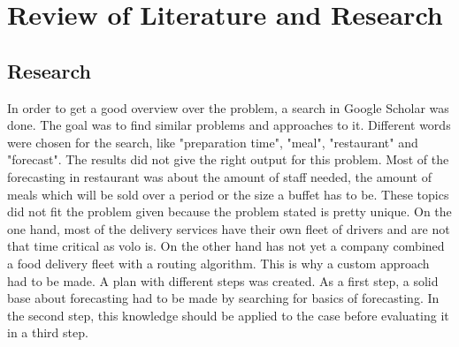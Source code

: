 \chapter{Review of Literature and Research}\label{chapter:Review of Literature and Research}
\section{Research}\label{section:Research}
In order to get a good overview over the problem, a search in Google Scholar was done. The goal was to find similar problems and approaches to it. Different words were chosen for the search, like "preparation time", "meal", "restaurant" and "forecast". The results did not give the right output for this problem. Most of the forecasting in restaurant was about the amount of staff needed, the amount of meals which will be sold over a period or the size a buffet has to
be. These topics did not fit the problem given because the problem stated is pretty unique. On the one hand, most of the delivery services have their own fleet of drivers and are not that time critical as volo is. On the other hand has not yet a company combined a food delivery fleet with a routing algorithm. This is why a custom approach had to be made.\newline
A plan with different steps was created. As a first step, a solid base about forecasting had to be made by searching for basics of forecasting. In the second step, this knowledge should be applied to the case before evaluating it in a third step.
